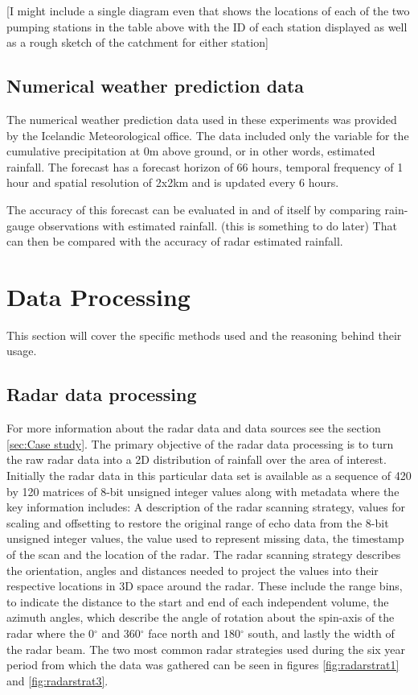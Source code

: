 [I might include a single diagram even that shows the locations of each of the two pumping stations in the table above with the ID of each station displayed as well as a rough sketch of the catchment for either station]



\subsection{Numerical weather prediction data}
The numerical weather prediction data used in these experiments was provided by the Icelandic Meteorological office. The data included only the variable for the cumulative precipitation at 0m above ground, or in other words, estimated rainfall. The forecast has a forecast horizon of 66 hours, temporal frequency of 1 hour and spatial resolution of 2x2km and is updated every 6 hours. 

The accuracy of this forecast can be evaluated in and of itself by comparing rain-gauge observations with estimated rainfall. (this is something to do later) That can then be compared with the accuracy of radar estimated rainfall. 




\section{Data Processing}
This section will cover the specific methods used and the reasoning behind their usage.


\subsection{Radar data processing}
For more information about the radar data and data sources see the section \ref{sec:Case study}. The primary objective of the radar data processing is to turn the raw radar data into a 2D distribution of rainfall over the area of interest. Initially the radar data in this particular data set is available as a sequence of 420 by 120 matrices of 8-bit unsigned integer values along with metadata where the key information includes: A description of the radar scanning strategy, values for scaling and offsetting to restore the original range of echo data from the 8-bit unsigned integer values, the value used to represent missing data, the timestamp of the scan and the location of the radar. The radar scanning strategy describes the orientation, angles and distances needed to project the values into their respective locations in 3D space around the radar. These include the range bins, to indicate the distance to the start and end of each independent volume, the azimuth angles, which describe the angle of rotation about the spin-axis of the radar where the 0$^{\circ}$  and 360$^{\circ}$ face north and 180$^{\circ}$ south, and lastly the width of the radar beam. The two most common radar strategies used during the six year period from which the data was gathered can be seen in figures \ref{fig:radarstrat1} and \ref{fig:radarstrat3}. 



